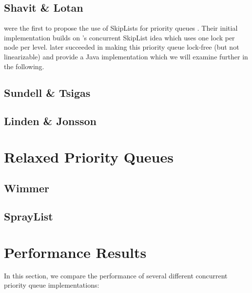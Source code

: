 \documentclass[a4paper,10pt]{article}
\begin{document}
\subsection{Shavit \& Lotan}

\citeauthor{shavit2000skiplist} were the first to propose the use of SkipLists
for priority queues \cite{linden2013skiplist}. Their initial implementation
\cite{shavit2000skiplist} builds on \citeauthor{pugh1998concurrent}'s concurrent
SkipList idea \cite{pugh1998concurrent} which uses one lock per node per level.
\citeauthor{herlihy2012art} \cite{herlihy2012art} later succeeded in making this
priority queue lock-free (but not linearizable) and provide a Java implementation
which we will examine further in the following.


\subsection{Sundell \& Tsigas}



\subsection{Linden \& Jonsson}

\section{Relaxed Priority Queues}

\subsection{Wimmer}
\subsection{SprayList}

\section{Performance Results}

In this section, we compare the performance of several different concurrent priority
queue implementations:
\end{document}
